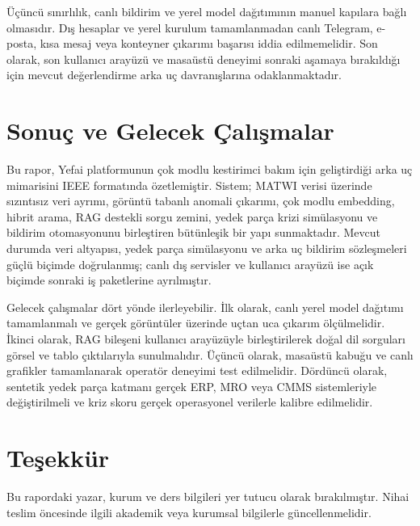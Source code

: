\documentclass[conference]{IEEEtran}
\begin{document}
Üçüncü sınırlılık, canlı bildirim ve yerel model dağıtımının manuel kapılara bağlı olmasıdır. Dış hesaplar ve yerel kurulum tamamlanmadan canlı Telegram, e-posta, kısa mesaj veya konteyner çıkarımı başarısı iddia edilmemelidir. Son olarak, son kullanıcı arayüzü ve masaüstü deneyimi sonraki aşamaya bırakıldığı için mevcut değerlendirme arka uç davranışlarına odaklanmaktadır.

\section{Sonuç ve Gelecek Çalışmalar}
Bu rapor, Yefai platformunun çok modlu kestirimci bakım için geliştirdiği arka uç mimarisini IEEE formatında özetlemiştir. Sistem; MATWI verisi üzerinde sızıntısız veri ayrımı, görüntü tabanlı anomali çıkarımı, çok modlu embedding, hibrit arama, RAG destekli sorgu zemini, yedek parça krizi simülasyonu ve bildirim otomasyonunu birleştiren bütünleşik bir yapı sunmaktadır. Mevcut durumda veri altyapısı, yedek parça simülasyonu ve arka uç bildirim sözleşmeleri güçlü biçimde doğrulanmış; canlı dış servisler ve kullanıcı arayüzü ise açık biçimde sonraki iş paketlerine ayrılmıştır.

Gelecek çalışmalar dört yönde ilerleyebilir. İlk olarak, canlı yerel model dağıtımı tamamlanmalı ve gerçek görüntüler üzerinde uçtan uca çıkarım ölçülmelidir. İkinci olarak, RAG bileşeni kullanıcı arayüzüyle birleştirilerek doğal dil sorguları görsel ve tablo çıktılarıyla sunulmalıdır. Üçüncü olarak, masaüstü kabuğu ve canlı grafikler tamamlanarak operatör deneyimi test edilmelidir. Dördüncü olarak, sentetik yedek parça katmanı gerçek ERP, MRO veya CMMS sistemleriyle değiştirilmeli ve kriz skoru gerçek operasyonel verilerle kalibre edilmelidir.

\section*{Teşekkür}
Bu rapordaki yazar, kurum ve ders bilgileri yer tutucu olarak bırakılmıştır. Nihai teslim öncesinde ilgili akademik veya kurumsal bilgilerle güncellenmelidir.



\end{document}
